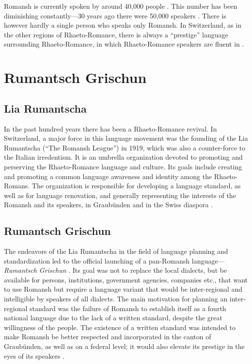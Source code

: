 Romansh is currently spoken by around 40,000 people \autocite{bundesamt2020}. 
This number has been diminishing constantly---30 years ago there were 50,000 speakers \autocite{haiman1992}. 
There is however hardly a single person who speaks only Romansh. 
In Switzerland, as in the other regions of Rhaeto-Romance, there is always a \enquote{prestige} language surrounding Rhaeto-Romance, in which Rhaeto-Romance speakers are fluent in \autocite[3]{haiman1992}. 

\section{Rumantsch Grischun}
\subsection{Lia Rumantscha}
In the past hundred years there has been a Rhaeto-Romance revival. 
In Switzerland, a major force in this language movement was the founding of the Lia Rumantscha (\enquote{The Romansh League}) in 1919, which was also a counter-force to the Italian irredentism\footnotemark[\value{footnote}]. 
It is an umbrella organization devoted to promoting and perserving the Rhaeto-Romance language and culture. Its goals include creating and promoting a common language awareness and identity among the Rhaeto-Romans. 
The organization is responsible for developing a language standard, as well as for language renovation, and generally representing the interests of the Romansh and its speakers, in Graubünden and in the Swiss diaspora \autocite{dazzi2012}.

\subsection{Rumantsch Grischun}
The endeavors of the Lia Rumantscha in the field of language planning and standardization led to the official launching of a pan-Romansh language---\emph{Rumantsch Grischun} \autocite[5]{haiman1992}. 
Its goal was not to replace the local dialects, but be available for persons, institutions, government agencies, companies etc., that want to use Romansh but require a language variant that would be inter-regional and intelligible by speakers of all dialects. The main motivation for planning an inter-regional standard was the failure of Romansh to establish itself as a fourth national language due to the lack of a written standard, despite the great willingness of the people.
The existence of a written standard was intended to make Romansh be better respected and incorporated in the canton of Graubünden, as well as on a federal level; 
it would also elevate its prestige in the eyes of its speakers \autocite{schmid1982}.

